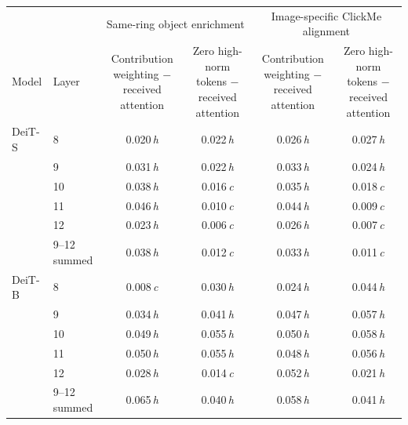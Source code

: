 \begin{tabular}{llcccc}
\toprule
 & & \multicolumn{2}{c}{Same-ring object enrichment} & \multicolumn{2}{c}{Image-specific ClickMe alignment} \\
\cmidrule(lr){3-4} \cmidrule(lr){5-6}
Model & Layer & \makecell[c]{Contribution \\ weighting $-$ \\ received \\ attention} & \makecell[c]{Zero high-norm \\ tokens $-$ \\ received \\ attention} & \makecell[c]{Contribution \\ weighting $-$ \\ received \\ attention} & \makecell[c]{Zero high-norm \\ tokens $-$ \\ received \\ attention} \\
\midrule
DeiT-S & 8 & 0.020\,\textit{h} & 0.022\,\textit{h} & 0.026\,\textit{h} & 0.027\,\textit{h} \\
 & 9 & 0.031\,\textit{h} & 0.022\,\textit{h} & 0.033\,\textit{h} & 0.024\,\textit{h} \\
 & 10 & 0.038\,\textit{h} & 0.016\,\textit{c} & 0.035\,\textit{h} & 0.018\,\textit{c} \\
 & 11 & 0.046\,\textit{h} & 0.010\,\textit{c} & 0.044\,\textit{h} & 0.009\,\textit{c} \\
 & 12 & 0.023\,\textit{h} & 0.006\,\textit{c} & 0.026\,\textit{h} & 0.007\,\textit{c} \\
 & 9--12 summed & 0.038\,\textit{h} & 0.012\,\textit{c} & 0.033\,\textit{h} & 0.011\,\textit{c} \\
\midrule
DeiT-B & 8 & 0.008\,\textit{c} & 0.030\,\textit{h} & 0.024\,\textit{h} & 0.044\,\textit{h} \\
 & 9 & 0.034\,\textit{h} & 0.041\,\textit{h} & 0.047\,\textit{h} & 0.057\,\textit{h} \\
 & 10 & 0.049\,\textit{h} & 0.055\,\textit{h} & 0.050\,\textit{h} & 0.058\,\textit{h} \\
 & 11 & 0.050\,\textit{h} & 0.055\,\textit{h} & 0.048\,\textit{h} & 0.056\,\textit{h} \\
 & 12 & 0.028\,\textit{h} & 0.014\,\textit{c} & 0.052\,\textit{h} & 0.021\,\textit{h} \\
 & 9--12 summed & 0.065\,\textit{h} & 0.040\,\textit{h} & 0.058\,\textit{h} & 0.041\,\textit{h} \\
\bottomrule
\end{tabular}
